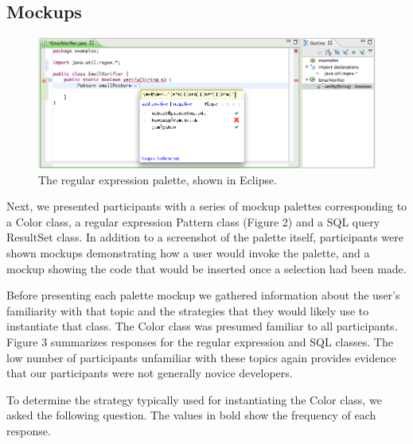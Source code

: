 \documentclass[conference]{IEEEtran}
\begin{document}
\subsection{Mockups}
\begin{figure}
  \includegraphics[scale=.6]{mockup-palette.png}
  \caption{The regular expression palette, shown in Eclipse.}
\end{figure}
Next, we presented participants with a series of mockup palettes corresponding to a Color class, a regular expression Pattern class (Figure 2) and a SQL query ResultSet class. In addition to a screenshot of the palette itself, participants were shown mockups demonstrating how a user would invoke the palette, and a mockup showing the code that would be inserted once a selection had been made. 

Before presenting each palette mockup we gathered information about the user's familiarity with that topic and the strategies that they would likely use to instantiate that class. The Color class was presumed familiar to all participants. Figure 3 summarizes responses for the regular expression and SQL classes. The low number of participants unfamiliar with these topics again provides evidence that our participants were not generally novice developers.

To determine the strategy typically used for instantiating the Color class, we asked the following question. The values in bold show the frequency of each response.
\end{document}
